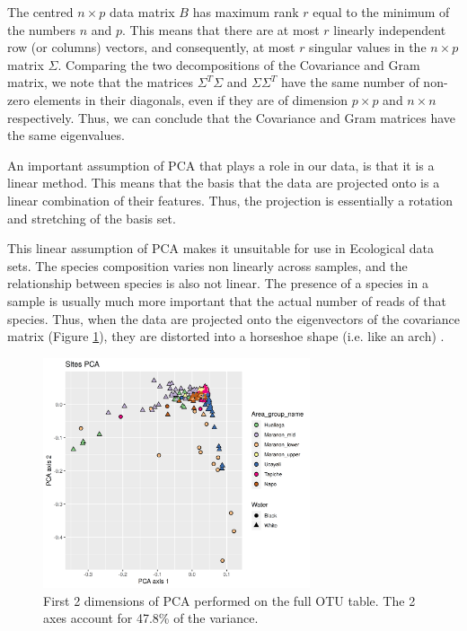 The centred $n \times p$ data matrix $B$ has maximum rank $r$ equal to the minimum of the numbers $n$ and $p$. This means that there are at most $r$ linearly independent row (or columns) vectors, and consequently, at most $r$ singular values in the $n \times p$ matrix $\Sigma$. Comparing the two decompositions of the Covariance and Gram matrix, we note that the matrices $\Sigma^T \Sigma$ and $\Sigma \Sigma^T$ have the same number of non-zero elements in their diagonals, even if they are of dimension $p \times p$ and $n \times n$ respectively. Thus, we can conclude that the Covariance and Gram matrices have the same eigenvalues.

An important assumption of PCA that plays a role in our data, is that it is a linear method. This means that the basis that the data are projected onto is a linear combination of their features. Thus, the projection is essentially a rotation and stretching of the basis set. 

This linear assumption of PCA makes it unsuitable for use in Ecological data sets. The species composition varies non linearly across samples, and the relationship between species is also not linear. The presence of a species in a sample is usually much more important that the actual number of reads of that species. Thus, when the data are projected onto the eigenvectors of the covariance matrix (Figure \ref{fig:pcaotu12}), they are distorted into a horseshoe shape (i.e. like an arch) \cite{Gauch 1982}.

\begin{figure}
\centering
\includegraphics[width = 0.7\textwidth]{"pcaotu12"}
\caption{First 2 dimensions of PCA performed on the full OTU table. The 2 axes account for 47.8\% of the variance.}
\label{fig:pcaotu12}
\end{figure}

